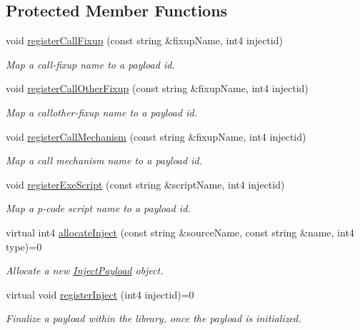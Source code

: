 \subsection*{Protected Member Functions}
\begin{DoxyCompactItemize}
\item 
void \mbox{\hyperlink{class_pcode_inject_library_a2c6c5deb054a7ab6f8e59653ce9d984f}{register\+Call\+Fixup}} (const string \&fixup\+Name, int4 injectid)
\begin{DoxyCompactList}\small\item\em Map a {\itshape call-\/fixup} name to a payload id. \end{DoxyCompactList}\item 
void \mbox{\hyperlink{class_pcode_inject_library_aa06eaa0357d6aeed80a3f64a5e914a53}{register\+Call\+Other\+Fixup}} (const string \&fixup\+Name, int4 injectid)
\begin{DoxyCompactList}\small\item\em Map a {\itshape callother-\/fixup} name to a payload id. \end{DoxyCompactList}\item 
void \mbox{\hyperlink{class_pcode_inject_library_a8e767c1d87d0cfabac0341c35c188b88}{register\+Call\+Mechanism}} (const string \&fixup\+Name, int4 injectid)
\begin{DoxyCompactList}\small\item\em Map a {\itshape call} {\itshape mechanism} name to a payload id. \end{DoxyCompactList}\item 
void \mbox{\hyperlink{class_pcode_inject_library_a73430017e8dc38985a1e20196e59eb85}{register\+Exe\+Script}} (const string \&script\+Name, int4 injectid)
\begin{DoxyCompactList}\small\item\em Map a {\itshape p-\/code} {\itshape script} name to a payload id. \end{DoxyCompactList}\item 
virtual int4 \mbox{\hyperlink{class_pcode_inject_library_a386a617992fcdd31d9abbf0728126686}{allocate\+Inject}} (const string \&source\+Name, const string \&name, int4 type)=0
\begin{DoxyCompactList}\small\item\em Allocate a new \mbox{\hyperlink{class_inject_payload}{Inject\+Payload}} object. \end{DoxyCompactList}\item 
virtual void \mbox{\hyperlink{class_pcode_inject_library_a0b75b562fb736f23269114fec5ca36d9}{register\+Inject}} (int4 injectid)=0
\begin{DoxyCompactList}\small\item\em Finalize a payload within the library, once the payload is initialized. \end{DoxyCompactList}\end{DoxyCompactItemize}
